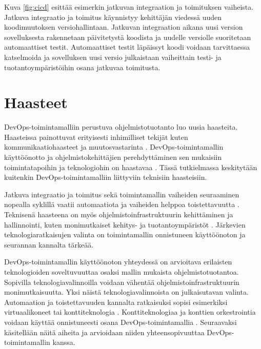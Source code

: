 Kuva \ref{fig:cicd} esittää esimerkin jatkuvan integraation ja toimituksen vaiheista.
Jatkuva integraatio ja toimitus käynnistyy kehittäjän viedessä uuden koodimuutoksen versiohallintaan.
Jatkuvan integraation aikana uusi version sovelluksesta rakennetaan päivitetystä koodista ja uudelle versiolle suoritetaan automaattiset testit.
Automaattiset testit läpäissyt koodi voidaan tarvittaessa katselmoida ja sovelluksen uusi versio julkaistaan vaiheittain testi- ja tuotantoympäristöihin osana jatkuvaa toimitusta.

\section{Haasteet}

DevOps-toimintamalliin perustuva ohjelmistotuotanto luo uusia haasteita.
Haasteissa painottuvat erityisesti inhimilliset tekijät kuten kommunikaatiohaasteet ja muutosvastarinta \cite{Kalliosaari16}.
DevOps-toimintamallin käyttöönotto ja ohjelmistokehittäjien perehdyttäminen sen mukaisiin toimintatapoihin ja teknologiohin on haastavaa \cite{Leite19}.
Tässä tutkielmassa keskitytään kuitenkin DevOps-toimintamalliin liittyviin teknisiin haasteisiin.

Jatkuva integraatio ja toimitus sekä toimintamallin vaiheiden seuraaminen nopealla syklillä vaatii automaatiota ja vaiheiden helppoa toistettavuutta \cite{Jabbari16, Leite19}.
Teknisenä haasteena on myös ohjelmistoinfrastruktuurin kehittäminen ja hallinnointi, kuten monimutkaiset kehitys- ja tuotantoympäristöt \cite{Khan22, Kalliosaari16}.
Järkevien teknologiaratkaisujen valinta on toimintamallin onnistuneen käyttöönoton ja seurannan kannalta tärkeää.

DevOps-toimintamallin käyttöönoton yhteydessä on arvioitava erilaisten teknologioiden soveltuvuuttaa osaksi mallin mukaista ohjelmistotuotantoa.
Sopivilla teknologiavalinnoilla voidaan vähentää ohjelmistoinfrastruktuurin monimutkaisuutta.
Yksi näistä teknologiavalinnoista on julkaisutavan valinta.
Automaation ja toistettavuuden kannalta ratkaisuksi sopisi esimerkiksi virtuaalikoneet tai konttiteknologia \cite{Dua14}.
Konttiteknologiaa ja konttien orkestrointia voidaan käyttää onnistuneesti osana DevOps-toimintamallia \mbox{\cite{Kang16, Narasimhulu23}}.
Seuraavaksi käsitellään näitä aiheita ja arvioidaan niiden yhteensopivuuttaa DevOps-toimintamallin kanssa.

